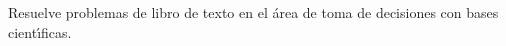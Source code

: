 Resuelve problemas de libro de texto en el \'{a}rea de toma de decisiones
con bases cient\'{\i}ficas.
